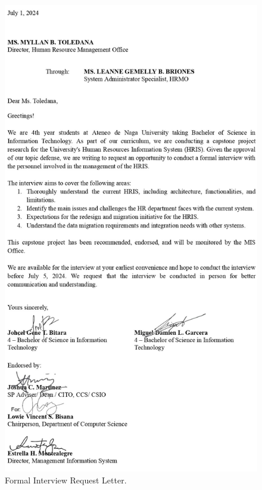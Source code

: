\begin{figure}[H]
    \centering
    \includegraphics[width=.78\linewidth]{figures/misc/minutes/interview-letter-request.jpg}
    \caption{Formal Interview Request Letter.}
    \label{fig:interview-letter-request}
\end{figure}


